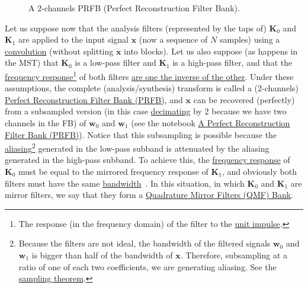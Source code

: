 \begin{figure}
  \centering
  \caption{A 2-channels PRFB (Perfect Reconstruction Filter Bank).}
  \label{fig:PRFB}
\end{figure}

Let us suppose now that the analysis filters (represented by the taps
of) ${\mathbf K}_0$ and ${\mathbf K}_1$ are applied to the input
signal ${\mathbf x}$ (now a sequence of $N$ samples) using a
\href{https://en.wikipedia.org/wiki/Kernel_(image_processing)}{convolution}
(without splitting $\mathbf{x}$ into blocks). Let us also suppose (as
happens in the MST) that ${\mathbf K}_0$ is a low-pass filter and
${\mathbf K}_1$ is a high-pass filter, and that the
\href{https://en.wikipedia.org/wiki/Filter_(signal_processing)}{frequency
  response}\footnote{The response (in the frequency domain) of the
  filter to the
  \href{https://en.wikipedia.org/?title=Unit_impulse&redirect=no}{unit
    impulse}.} of both filters
\href{https://en.wikipedia.org/wiki/Filter_bank#Perfect_reconstruction_filter_banks}{are
  one the inverse of the other}. Under these assumptions, the complete
(analysis/synthesis) transform is called a (2-channels)
\href{https://en.wikipedia.org/wiki/Filter_bank#Perfect_reconstruction_filter_banks}{Perfect
  Reconstruction Filter Bank (PRFB)}, and ${\mathbf x}$ can be
recovered (perfectly) from a subsampled version (in this case
\href{https://en.wikipedia.org/wiki/Downsampling_(signal_processing)}{decimating}
by 2 because we have two channels in the FB) of ${\mathbf w}_0$ and
${\mathbf w}_1$ (see the notebook
\href{https://github.com/Tecnologias-multimedia/intercom/blob/master/docs/PRFB.ipynb}{A
  Perfect Reconstruction Filter Bank (PRFB)}). Notice that this
subsampling is possible because the
\href{https://en.wikipedia.org/wiki/Aliasing}{aliasing}\footnote{Because
  the filters are not ideal, the bandwidth of the filtered signals
  ${\mathbf w}_0$ and ${\mathbf w}_1$ is bigger than half of the
  bandwidth of ${\mathbf x}$. Therefore, subsampling at a ratio of one
  of each two coefficients, we are generating aliasing. See the
  \href{https://en.wikipedia.org/wiki/Nyquist-Shannon_sampling_theorem}{sampling
    theorem}.}  generated in the low-pass subband is attenuated by the
aliasing generated in the high-pass subband. To achieve this, the
\href{https://en.wikipedia.org/wiki/Filter_(signal_processing)}{frequency
  response} of ${\mathbf K}_0$ must be equal to the mirrored frequency
response of ${\mathbf K}_1$, and obviously both filters must have the
same
\href{https://en.wikipedia.org/wiki/Bandwidth_(signal_processing)}{bandwidth}~\cite{sayood2017introduction}. In
this situation, in which ${\mathbf K}_0$ and ${\mathbf K}_1$ are
mirror filters, we say that they form a
\href{https://en.wikipedia.org/wiki/Quadrature_mirror_filter}{Quadrature
  Mirror Filters (QMF) Bank}.

